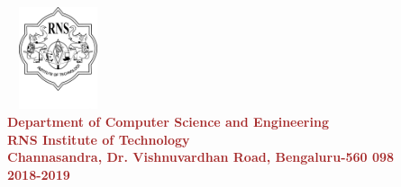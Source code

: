 \begin{titlepage}
\begin{center}
\includegraphics[width=3cm, height=3cm]{./RNS_logo.png}\\[0.1in]

\textup{\normalsize {\textcolor{brown}{\bf Department of Computer Science and Engineering} \\ {\textcolor{brown}{\bf \bf{RNS Institute of Technology}}}}}\\
\textup{\small {\textcolor{brown}{\bf Channasandra, Dr. Vishnuvardhan Road, Bengaluru-560 098}\\ \textbf {\textcolor{brown}{2018-2019}}}}
\end{center}
\end{titlepage}
